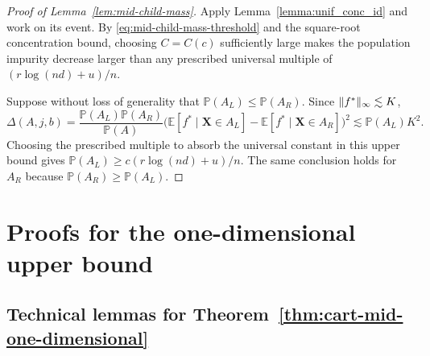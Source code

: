 \documentclass[11pt]{article}
\theoremstyle{plain}
\theoremstyle{definition}
\theoremstyle{remark}
\theoremstyle{plain}
\newcommand{\bX}{\mathbf{X}}
\DeclarePairedDelimiter{\norm}{\|}{\|}
\renewcommand{\P}{\mathbb{P}}
\newcommand{\E}{\mathbb{E}}
\newcommand{\1}{\mathbbm{1}}
\begin{document}
\begin{proof}[Proof of Lemma~\ref{lem:mid-child-mass}]
Apply Lemma~\ref{lemma:unif_conc_id} and work on its event. By
\eqref{eq:mid-child-mass-threshold} and the square-root concentration
bound, choosing $C=C(c)$ sufficiently large makes the population
impurity decrease larger than any prescribed universal multiple of $(r\log(nd)+u)/n$.

Suppose without loss of generality that $\P(A_L)\leq\P(A_R)$. Since
$\norm{f^*}_\infty\lesssim K$,
\[
\Delta(A,j,b)
=\frac{\P(A_L)\P(A_R)}{\P(A)}
\bigl(\E[f^*\mid\bX\in A_L]-\E[f^*\mid\bX\in A_R]\bigr)^2
\lesssim \P(A_L)K^2.
\]
Choosing the prescribed multiple to absorb the universal constant in
this upper bound gives
$\P(A_L)\ge c(r\log(nd)+u)/n$. The same conclusion holds for $A_R$
because $\P(A_R)\ge\P(A_L)$.
\end{proof}

\section{Proofs for the one-dimensional upper bound}
\label{app:one-dimensional-upper-proofs}

\subsection{Technical lemmas for Theorem~\ref{thm:cart-mid-one-dimensional}}
\label{sec:one-dimensional-technical-lemmas}
\end{document}

